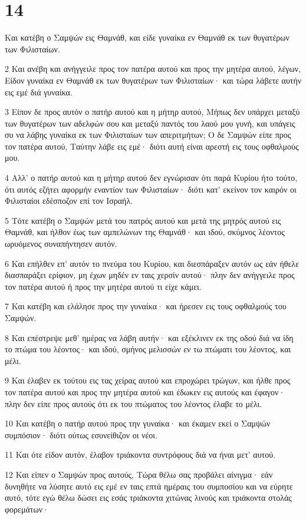 \chapter{14}

\par Και κατέβη ο Σαμψών εις Θαμνάθ, και είδε γυναίκα εν Θαμνάθ εκ των θυγατέρων των Φιλισταίων.
\par 2 Και ανέβη και ανήγγειλε προς τον πατέρα αυτού και προς την μητέρα αυτού, λέγων, Είδον γυναίκα εν Θαμνάθ εκ των θυγατέρων των Φιλισταίων· και τώρα λάβετε αυτήν εις εμέ διά γυναίκα.
\par 3 Είπον δε προς αυτόν ο πατήρ αυτού και η μήτηρ αυτού, Μήπως δεν υπάρχει μεταξύ των θυγατέρων των αδελφών σου και μεταξύ παντός του λαού μου γυνή, και υπάγεις συ να λάβης γυναίκα εκ των Φιλισταίων των απεριτμήτων; Ο δε Σαμψών είπε προς τον πατέρα αυτού, Ταύτην λάβε εις εμέ· διότι αυτή είναι αρεστή εις τους οφθαλμούς μου.
\par 4 Αλλ' ο πατήρ αυτού και η μήτηρ αυτού δεν εγνώρισαν ότι παρά Κυρίου ήτο τούτο, ότι αυτός εζήτει αφορμήν εναντίον των Φιλισταίων· διότι κατ' εκείνον τον καιρόν οι Φιλισταίοι εδέσποζον επί τον Ισραήλ.
\par 5 Τότε κατέβη ο Σαμψών μετά του πατρός αυτού και μετά της μητρός αυτού εις Θαμνάθ, και ήλθον έως των αμπελώνων της Θαμνάθ· και ιδού, σκύμνος λέοντος ωρυόμενος συναπήντησεν αυτόν.
\par 6 Και επήλθεν επ' αυτόν το πνεύμα του Κυρίου, και διεσπάραξεν αυτόν ως εάν ήθελε διασπαράξει ερίφιον, μη έχων μηδέν εν ταις χερσίν αυτού· πλην δεν ανήγγειλε προς τον πατέρα αυτού ή προς την μητέρα αυτού τι είχε κάμει.
\par 7 Και κατέβη και ελάλησε προς την γυναίκα· και ήρεσεν εις τους οφθαλμούς του Σαμψών.
\par 8 Και επέστρεψε μεθ' ημέρας να λάβη αυτήν· και εξέκλινεν εκ της οδού διά να ίδη το πτώμα του λέοντος· και ιδού, σμήνος μελισσών εν τω πτώματι του λέοντος, και μέλι.
\par 9 Και έλαβεν εκ τούτου εις τας χείρας αυτού και επροχώρει τρώγων, και ήλθε προς τον πατέρα αυτού και προς την μητέρα αυτού και έδωκεν εις αυτούς και έφαγον· πλην δεν είπε προς αυτούς ότι εκ του πτώματος του λέοντος έλαβε το μέλι.
\par 10 Και κατέβη ο πατήρ αυτού προς την γυναίκα· και έκαμεν εκεί ο Σαμψών συμπόσιον· διότι ούτως εσυνείθιζον οι νέοι.
\par 11 Και ότε είδον αυτόν, έλαβον τριάκοντα συντρόφους διά να ήναι μετ' αυτού.
\par 12 Και είπεν ο Σαμψών προς αυτούς, Τώρα θέλω σας προβάλει αίνιγμα· εάν δυνηθήτε να λύσητε αυτό εις εμέ εν ταις επτά ημέραις του συμποσίου και να εύρητε αυτό, τότε εγώ θέλω δώσει εις εσάς τριάκοντα χιτώνας λινούς και τριάκοντα στολάς φορεμάτων·
